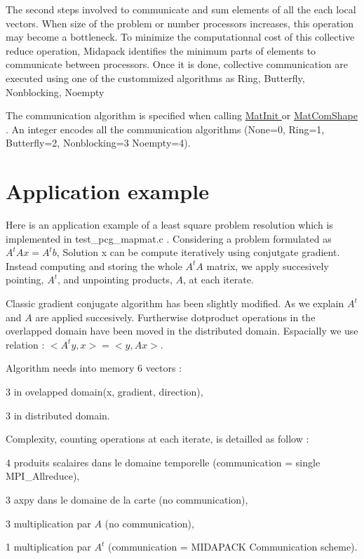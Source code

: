 The second steps involved to communicate and sum elements of all the each local vectors. When size of the problem or number processors increases, this operation may become a bottleneck. To minimize the computationnal cost of this collective reduce operation, Midapack identifies the minimum parts of elements to communicate between processors. Once it is done, collective communication are executed using one of the custommized algorithms as Ring, Butterfly, Nonblocking, Noempty

The communication algorithm is specified when calling \hyperlink{group__matmap__group11_ga16fec1005b6f01bda1dd6154c26c27ed}{Mat\-Init } or \hyperlink{group__matmap__group11_ga61b3b348d7c039aadfc3196e6b83535a}{Mat\-Com\-Shape }. An integer encodes all the communication algorithms (None=0, Ring=1, Butterfly=2, Nonblocking=3 Noempty=4).

\par
 \hypertarget{example}{}\section{Application example}\label{example}
Here is an application example of a least square problem resolution which is implemented in test\-\_\-pcg\-\_\-mapmat.\-c . Considering a problem formulated as $ A^t A x = A^t b $, Solution x can be compute iteratively using conjutgate gradient. Instead computing and storing the whole $A^tA$ matrix, we apply succesively pointing, $A^t$, and unpointing products, $A$, at each iterate.

Classic gradient conjugate algorithm has been slightly modified. As we explain $A^t$ and $A$ are applied succesively. Furtherwise dotproduct operations in the overlapped domain have been moved in the distributed domain. Espacially we use relation \-: $< A^t y, x > = < y , Ax > $.

Algorithm needs into memory 6 vectors \-:
\begin{DoxyItemize}
\item 3 in ovelapped domain(x, gradient, direction),
\item 3 in distributed domain.
\end{DoxyItemize}

Complexity, counting operations at each iterate, is detailled as follow \-:
\begin{DoxyItemize}
\item 4 produits scalaires dans le domaine temporelle (communication = single M\-P\-I\-\_\-\-Allreduce),
\item 3 axpy dans le domaine de la carte (no communication),
\item 3 multiplication par $A$ (no communication),
\item 1 multiplication par $A^t$ (communication = M\-I\-D\-A\-P\-A\-C\-K Communication scheme).
\end{DoxyItemize}


